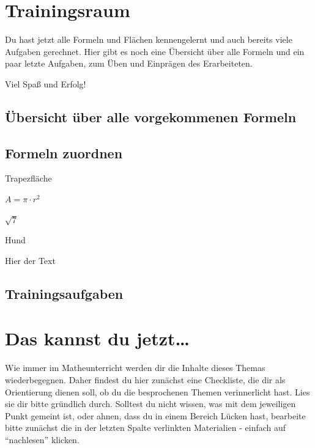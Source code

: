 \documentclass[
  ngerman,
]{book}
\begin{document}
\hypertarget{trainingsraum}{%
\chapter{Trainingsraum}\label{trainingsraum}}

Du hast jetzt alle Formeln und Flächen kennengelernt und auch bereits viele Aufgaben gerechnet. Hier gibt es noch eine Übersicht über alle Formeln und ein paar letzte Aufgaben, zum Üben und Einprägen des Erarbeiteten.

Viel Spaß und Erfolg!

\hypertarget{uxfcbersicht-uxfcber-alle-vorgekommenen-formeln}{%
\section*{Übersicht über alle vorgekommenen Formeln}\label{uxfcbersicht-uxfcber-alle-vorgekommenen-formeln}}

\hypertarget{formeln-zuordnen}{%
\section*{Formeln zuordnen}\label{formeln-zuordnen}}

\hypertarget{dropZone}{}
\hypertarget{dropBox1}{}
Trapezfläche

\hypertarget{dropBox2}{}
\(A=\pi \cdot r^2\)

\hypertarget{dropBox3}{}
\(\sqrt{7}\)

\hypertarget{dropBox4}{}
Hund

\hypertarget{animals}{}
Hier der Text

\hypertarget{trainingsaufgaben}{%
\section*{Trainingsaufgaben}\label{trainingsaufgaben}}

\hypertarget{das-kannst-du-jetzt}{%
\chapter{Das kannst du jetzt\ldots{}}\label{das-kannst-du-jetzt}}

Wie immer im Matheunterricht werden dir die Inhalte dieses Themas wiederbegegnen. Daher findest du hier zunächst eine Checkliste, die dir als Orientierung dienen soll, ob du die besprochenen Themen verinnerlicht hast. Lies sie dir bitte gründlich durch. Solltest du nicht wissen, was mit dem jeweiligen Punkt gemeint ist, oder ahnen, dass du in einem Bereich Lücken hast, bearbeite bitte zunächst die in der letzten Spalte verlinkten Materialien - einfach auf ``nachlesen'' klicken.
\end{document}
